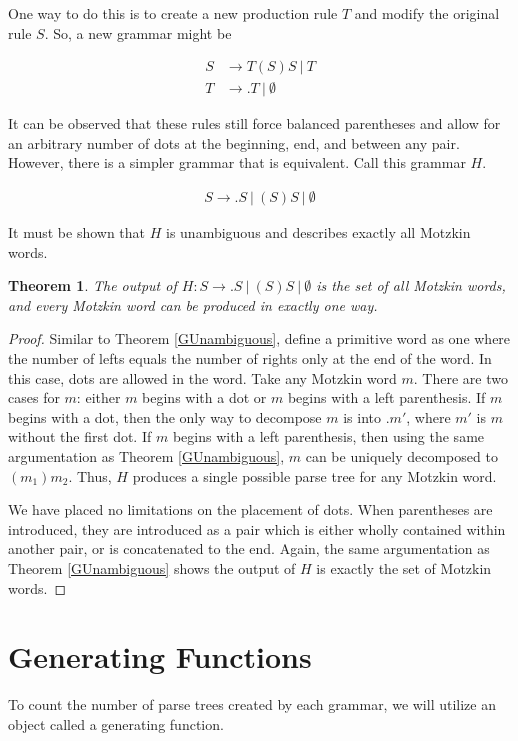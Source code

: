 \documentclass[11pt]{amsart}
\theoremstyle{plain}%
\newtheorem{thm}{Theorem}[section]
\theoremstyle{definition}
\theoremstyle{remark}
\numberwithin{equation}{thm}
\begin{document}
One way to do this is to create a new production rule $T$ and modify the original rule $S$. So, a new grammar might be

\begin{align*}
S &\rightarrow T(S)S\ |\ T\\
T &\rightarrow .T\ |\ \emptyset
\end{align*}

It can be observed that these rules still force balanced parentheses and allow for an arbitrary number of dots at the beginning, end, and between any pair. However, there is a simpler grammar that is equivalent. Call this grammar $H$.

\begin{align*}
S \rightarrow .S\ |\ (S)S\ |\ \emptyset
\end{align*}

It must be shown that $H$ is unambiguous and describes exactly all Motzkin words.

\begin{thm}
The output of $H: S \rightarrow .S\ |\ (S)S\ |\ \emptyset$ is the set of all Motzkin words, and every Motzkin word can be produced in exactly one way.
\end{thm}

\begin{proof}
Similar to Theorem \ref{GUnambiguous}, define a primitive word as one where the number of lefts equals the number of rights only at the end of the word. In this case, dots are allowed in the word. Take any Motzkin word $m$. There are two cases for $m$: either $m$ begins with a dot or $m$ begins with a left parenthesis. If $m$ begins with a dot, then the only way to decompose $m$ is into $.m'$, where $m'$ is $m$ without the first dot. If $m$ begins with a left parenthesis, then using the same argumentation as Theorem \ref{GUnambiguous}, $m$ can be uniquely decomposed to $(m_1)m_2$. Thus, $H$ produces a single possible parse tree for any Motzkin word.

We have placed no limitations on the placement of dots. When parentheses are introduced, they are introduced as a pair which is either wholly contained within another pair, or is concatenated to the end. Again, the same argumentation as Theorem \ref{GUnambiguous} shows the output of $H$ is exactly the set of Motzkin words.
\end{proof}

\section{Generating Functions}
To count the number of parse trees created by each grammar, we will utilize an object called a generating function.
\end{document}
